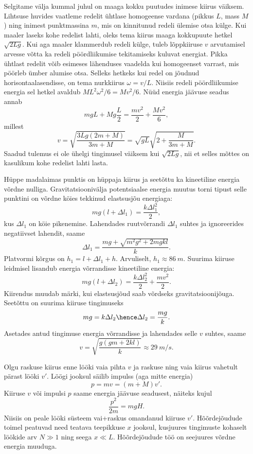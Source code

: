 \documentclass[10pt]{article}
\begin{document}
{
\solu
Selgitame välja kummal juhul on maaga kokku puutudes inimese kiirus väiksem. Lihtsuse huvides vaatleme redelit ühtlase
homogeense vardana (pikkus $L$, mass $M$) ning inimest punktmassina $m$, mis on kinnitunud redeli ülemise otsa külge. Kui maaler laseks kohe redelist lahti, oleks tema kiirus maaga kokkupuute hetkel $\sqrt{2Lg}$. Kui aga maaler klammerdub redeli külge, tuleb lõppkiiruse $v$ arvutamisel arvesse võtta ka redeli pöördliikumise tekitamiseks kuluvat energiat. Pikka ühtlast redelit võib esimeses lähenduses vaadelda kui homogeenset varrast, mis pöörleb ümber alumise otsa. Selleks hetkeks kui redel on jõudnud horisontaalasendisse, on tema nurkkiirus $\omega=v/L$. Niisiis redeli pöördliikumise energia sel hetkel avaldub $ML^2\omega^2/6=Mv^2/6$. Nüüd energia jäävuse seadus annab
\[
mgL+Mg\frac{L}{2}=\frac{mv^2}{2} +\frac{Mv^2}{6},
\]
millest
\[
v=\sqrt{\frac{3Lg(2m+M)}{3m+M}}=\sqrt{gL}\sqrt{2+\frac{M}{3m+M}}.
\]
Saadud tulemus ei ole ühelgi tingimusel väiksem kui $\sqrt{2Lg}$, nii et selles mõttes on kasulikum kohe redelist lahti lasta.
\probend
\bigskip


\solu
Hüppe madalaimas punktis on hüppaja kiirus ja seetõttu ka kineetiline energia võrdne nulliga. Gravitatsioonivälja potentsiaalse energia muutus torni tipust selle punktini on võrdne köies tekkinud elastsusjõu energiaga:
\[
mg(l+\Delta l_1)=\frac{k\Delta l_1^2}{2},
\]
kus $\Delta l_1$ on köie pikenemine. Lahendades ruutvõrrandi $\Delta l_1$ suhtes ja ignoreerides negatiivset lahendit, saame
\[
\Delta l_1=\frac{mg+\sqrt{m^2g^2+2mgkl}}{k}.
\]
Platvormi kõrgus on $h_1=l+\Delta l_1+h$.
Arvuliselt, $h_1\approx \SI{86}{m}$.
Suurima kiiruse leidmisel lisandub energia võrrandisse kineetiline energia:
\[
mg(l+\Delta l_2)=\frac{k\Delta l_2^2}{2}+\frac{mv^2}{2}.
\]
Kiirendus muudab märki, kui elastsusjõud saab võrdseks gravitatsioonijõuga. Seetõttu on suurima kiiruse tingimuseks
\[
mg=k\Delta l_2 \hence \Delta l_2=\frac{mg}{k}.
\]
Asetades antud tingimuse energia võrrandisse ja lahendades selle $v$ suhtes, saame
\[
v=\sqrt{\frac{g(gm+2kl)}{k}} \approx \SI{29}{m/s}.
\]
\probend
\bigskip


\solu
Olgu raskuse kiirus enne lööki vaia pihta $v$ ja raskuse ning vaia kiirus vahetult
pärast lööki $v'$. Löögi jooksul säilib impulss (aga mitte energia) 
\[
p = mv = (m + M)v'.
\] 
Kiiruse $v$ või impulsi $p$ saame energia jäävuse seadusest, näiteks kujul
\[
\frac{p^2}{2m} = mgH.
\]
Niisiis on peale lööki süsteem vai+raskus omandanud kiiruse $v'$. Hõõrdejõudude toimel peatuvad need teatava teepikkuse $x$ jooksul, kusjuures tingimuste kohaselt löökide arv $N \gg 1$ ning seega $x \ll L$. Hõõrdejõudude töö on seejuures võrdne energia muuduga.

}
\end{document}
